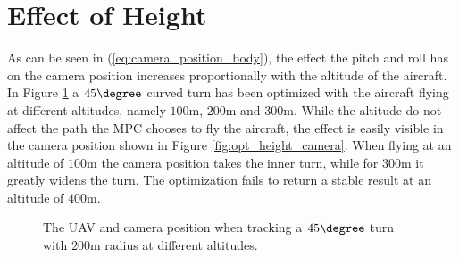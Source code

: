 \section{Effect of Height}

As can be seen in (\ref{eq:camera_position_body}), the effect the pitch and roll has on the camera position increases proportionally with the altitude of the aircraft. In Figure \ref{fig:opt_height} a $45\degree$ curved turn has been optimized with the aircraft flying at different altitudes, namely $100$m, $200$m and $300$m. While the altitude do not affect the path the MPC chooses to fly the aircraft, the effect is easily visible in the camera position shown in Figure \ref{fig:opt_height_camera}. When flying at an altitude of $100$m the camera position takes the inner turn, while for $300$m it greatly widens the turn. The optimization fails to return a stable result at an altitude of $400$m.

\begin{figure}
	\caption{The UAV and camera position when tracking a $45\degree$ turn with $200$m radius at different altitudes.}
	\label{fig:opt_height}
\end{figure}